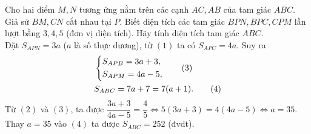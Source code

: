 \begin{bt}%
Cho hai điểm $ M, N $ tương ứng nằm trên các cạnh $ AC, AB $ của tam giác $ ABC $. Giả sử $ BM, CN $ cắt nhau tại $ P $. Biết diện tích các tam giác $ BPN, BPC, CPM $ lần lượt bằng $ 3, 4, 5 $ (đơn vị diện tích). Hãy tính diện tích tam giác $ ABC $.
\loigiai
{
 \noindent \\[3pt]
Đặt $ S_{APN} = 3a $ ($ a $ là số thực dương), từ $ (1) $ ta có $ S_{APC} = 4a $. Suy ra 
{\allowdisplaybreaks
\begin{align*} 
&\left\{\begin{aligned}& S_{APB} = 3a + 3,\\& S_{APM} = 4a - 5,  \end{aligned}\right. \tag{3} \\ 
&S_{ABC} = 7a + 7 =  7(a+1).\tag{4}
\end{align*}}Từ $ (2) $ và $ (3) $, ta được $ \dfrac{3a+ 3}{4a - 5} = \dfrac{4}{5}    \Leftrightarrow 5(3a+3) = 4(4a-5) \Leftrightarrow a = 35$.\\
Thay $ a = 35 $ vào $ (4) $ ta được $ S_{ABC} = 252 $ (đvdt).
}
\end{bt}

